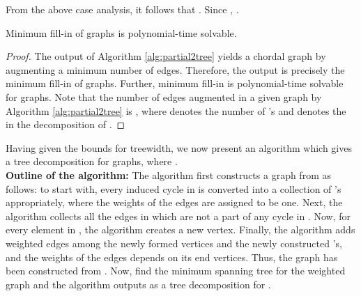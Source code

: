 \documentclass[runningheads]{llncs}
\begin{document}
\noindent From the above case analysis, it follows that . Since , .

\begin{corollary}
\label{minfillin}
Minimum fill-in of  graphs is polynomial-time solvable.
\end{corollary}
\begin{proof}
The output of Algorithm \ref{alg:partial2tree} yields a chordal graph by augmenting a minimum number of edges. Therefore, the output is precisely the minimum fill-in of  graphs. Further, minimum fill-in is polynomial-time solvable for  graphs. Note that the number of edges augmented in a given graph  by Algorithm \ref{alg:partial2tree} is , where  denotes the number of 's and  denotes the  in the decomposition of .

\end{proof}

\noindent Having given the bounds for treewidth, we now present an algorithm which gives a tree decomposition for  graphs, where .\\

\noindent \textbf{Outline of the algorithm:}
The algorithm first constructs a graph  from  as follows: to start with, every induced cycle in  is converted into a collection of 's appropriately, where the weights of the edges are assigned to be one. Next, the algorithm collects all the edges in  which are not a part of any cycle in . Now, for every element in , the algorithm creates a new vertex. Finally, the algorithm adds weighted edges among the newly formed vertices and the newly constructed 's, and the weights of the edges depends on its end vertices.  Thus, the graph  has been constructed from . Now, find the minimum spanning tree  for the weighted graph  and the algorithm outputs  as a tree decomposition for .
\end{document}
